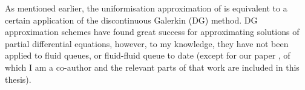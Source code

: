 As mentioned earlier, the uniformisation approximation of \cite{bo2013} is equivalent to a certain application of the {discontinuous Galerkin (DG) method}. DG approximation schemes have found great success for approximating solutions of partial differential equations, however, to my knowledge, they have not been applied to fluid queues, or fluid-fluid queue to date (except for our paper \cite{blnos2022}, of which I am a co-author and the relevant parts of that work are included in this thesis). %








